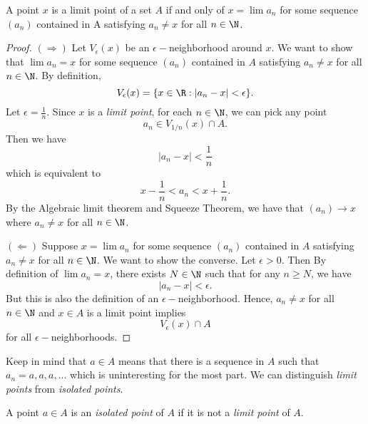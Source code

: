 \begin{tcolorbox}
\begin{thm}
A point \( x \) is a limit point of a set \( A \) if and only of \( x = \lim a_n \) for some sequence \( (a_n) \) contained in A satisfying \( a_n \neq x  \) for all \( n \in \N  \). 
\end{thm}
\end{tcolorbox}

\begin{proof}
    \( (\Rightarrow) \) Let \( V_{\epsilon }(x) \) be an \( \epsilon-\)neighborhood around \( x \). We want to show that \( \lim a_n = x  \) for some sequence \( (a_n) \) contained in \( A  \) satisfying \( a_n \neq x  \) for all \( n \in \N  \). By definition, 
    \[ V_{\epsilon}(x) = \{ x \in \R : | a_n - x  | < \epsilon  \}.  \]
    Let \( \epsilon = \frac{ 1 }{ n }  \). Since \( x  \) is a \textit{limit point}, for each \( n \in \N  \), we can pick any point 
    \[ a_n \in V_{1/n}(x) \cap A. \]Then we have 
    \[  | a_n - x | < \frac{ 1 }{ n }  \]
    which is equivalent to 
    \[ x - \frac{ 1 }{ n } < a_n < x + \frac{ 1 }{ n }. \] 
    By the Algebraic limit theorem and Squeeze Theorem, we have that \( (a_n) \to x  \) where \( a_n \neq x  \) for all \( n \in \N  \). 

    \( (\Leftarrow) \) Suppose \( x = \lim a_n \) for some sequence \( (a_n) \) contained in \( A \) satisfying \( a_n \neq x  \) for all \( n \in \N  \). We want to show the converse. Let \( \epsilon > 0  \). Then By definition of \( \lim a_n = x  \), there exists \( N \in \N  \) such that for any \( n \geq N \), we have  
    \[  | a_n - x  | < \epsilon.  \]
    But this is also the definition of an \( \epsilon-\)neighborhood. Hence, \( a_n \neq x  \) for all \( n \in \N  \) and \( x \in A  \) is a limit point implies 
    \[ V_{\epsilon }(x) \cap A \]
    for all \( \epsilon- \)neighborhoods. 
\end{proof}

Keep in mind that \( a \in A  \) means that there is a sequence in \( A  \) such that \( a_n = {a,a,a, ...} \) which is uninteresting for the most part. We can distinguish \textit{limit points} from \textit{isolated points}.  

\begin{tcolorbox}
\begin{defn}
A point \( a \in A  \) is an \textit{isolated point} of \( A \) if it is not a \textit{limit point} of \( A \).  
\end{defn}
\end{tcolorbox}

